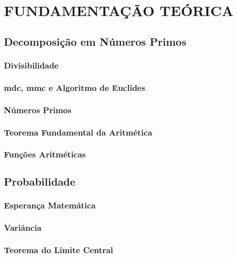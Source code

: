 \chapter{FUNDAMENTAÇÃO TEÓRICA}
\label{cap:fundamentacao-teorica}

  \section{Decomposição em Números Primos}
  
  	\subsection{Divisibilidade}
  	
  	\subsection{mdc, mmc e Algoritmo de Euclides}
  	
  	\subsection{Números Primos}
  	
  	\subsection{Teorema Fundamental da Aritmética}
  
  	\subsection{Funções Aritméticas}
  	
  \section{Probabilidade}
  	
  	\subsection{Esperança Matemática}
  	
  	\subsection{Variância}
  	
  	\subsection{Teorema do Limite Central}
  	
